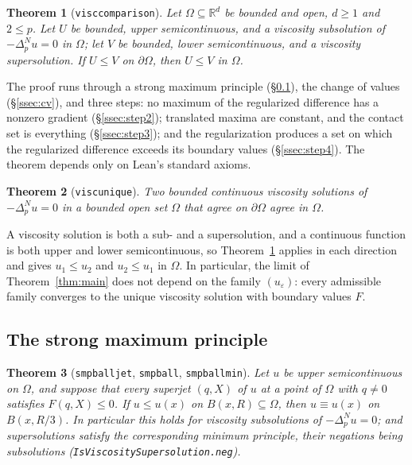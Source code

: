 \documentclass[11pt,reqno]{amsart}
\newcommand{\LEANREF}[1]{\texttt{\small\def\_{\textunderscore\allowbreak}#1}}
\newcommand{\R}{\mathbb{R}}
\newcommand{\eps}{\varepsilon}
\newcommand{\pnlap}{\Delta_p^{N}}
\theoremstyle{plain}
\newtheorem{theorem}{Theorem}[section]
\theoremstyle{definition}
\begin{document}
\begin{theorem}[\LEANREF{visc\_comparison}]\label{thm:viscomp}
Let $\Omega \subseteq \R^d$ be bounded and open, $d \ge 1$ and $2 \le p$. Let $U$
be bounded, upper semicontinuous, and a viscosity subsolution of
$-\pnlap u = 0$ in $\Omega$; let $V$ be bounded, lower semicontinuous, and a
viscosity supersolution. If $U \le V$ on $\partial\Omega$, then $U \le V$ in
$\Omega$.
\end{theorem}

The proof runs through a strong maximum principle
(\S\ref{ssec:smp}), the change of values (\S\ref{ssec:cv}), and three steps:
no maximum of the regularized difference has a nonzero gradient
(\S\ref{ssec:step2}); translated maxima are constant, and the contact set is
everything (\S\ref{ssec:step3}); and the regularization produces a set on which
the regularized difference exceeds its boundary values (\S\ref{ssec:step4}).
The theorem depends only on Lean's standard axioms.

\begin{theorem}[\LEANREF{visc\_unique}]\label{thm:viscunique}
Two bounded continuous viscosity solutions of $-\pnlap u = 0$ in a bounded open
set $\Omega$ that agree on $\partial\Omega$ agree in $\Omega$.
\end{theorem}

A viscosity solution is both a sub- and a supersolution, and a continuous
function is both upper and lower semicontinuous, so Theorem~\ref{thm:viscomp}
applies in each direction and gives $u_1 \le u_2$ and $u_2 \le u_1$ in
$\Omega$. In particular, the limit of Theorem~\ref{thm:main} does not depend
on the family $(u_\eps)$: every admissible family converges to the unique
viscosity solution with boundary values $F$.

\subsection{The strong maximum principle}\label{ssec:smp}

\begin{theorem}[\LEANREF{smp\_ball\_jet}, \LEANREF{smp\_ball},
\LEANREF{smp\_ball\_min}]\label{thm:smp}
Let $u$ be upper semicontinuous on $\Omega$, and suppose that every superjet
$(q, X)$ of $u$ at a point of $\Omega$ with $q \ne 0$ satisfies
$F(q, X) \le 0$. If $u \le u(x)$ on $B(x, R) \subseteq \Omega$, then
$u \equiv u(x)$ on $B(x, R/3)$. In particular this holds for viscosity
subsolutions of $-\pnlap u = 0$; and supersolutions satisfy the corresponding
minimum principle, their negations being subsolutions
(\LEANREF{IsViscositySupersolution.neg}).
\end{theorem}
\end{document}
